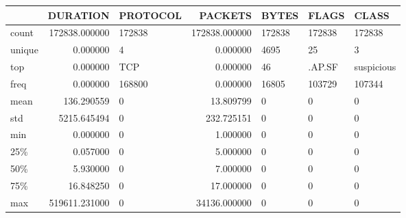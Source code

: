 \begin{tabular}{lrlrlll}
\toprule
{} &       DURATION & PROTOCOL &        PACKETS &     BYTES &   FLAGS &       CLASS \\
\midrule
count  &  172838.000000 &   172838 &  172838.000000 &    172838 &  172838 &      172838 \\
unique &       0.000000 &        4 &       0.000000 &      4695 &      25 &           3 \\
top    &       0.000000 &    TCP   &       0.000000 &        46 &  .AP.SF &  suspicious \\
freq   &       0.000000 &   168800 &       0.000000 &     16805 &  103729 &      107344 \\
mean   &     136.290559 &        0 &      13.809799 &         0 &       0 &           0 \\
std    &    5215.645494 &        0 &     232.725151 &         0 &       0 &           0 \\
min    &       0.000000 &        0 &       1.000000 &         0 &       0 &           0 \\
25\%    &       0.057000 &        0 &       5.000000 &         0 &       0 &           0 \\
50\%    &       5.930000 &        0 &       7.000000 &         0 &       0 &           0 \\
75\%    &      16.848250 &        0 &      17.000000 &         0 &       0 &           0 \\
max    &  519611.231000 &        0 &   34136.000000 &         0 &       0 &           0 \\
\bottomrule
\end{tabular}

